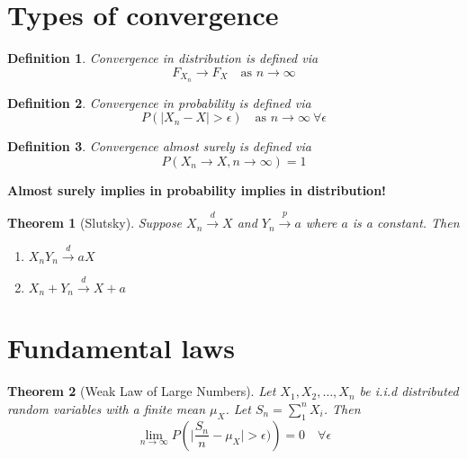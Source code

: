 \documentclass[10pt,a4paper]{article}
\newtheorem{definition}{Definition}
\newtheorem{theorem}{Theorem}
\begin{document}
\section{Types of convergence}

\begin{definition}
Convergence in distribution is defined via
\begin{equation}
F_{X_n} \rightarrow F_X \quad \text{as } n \rightarrow \infty
\end{equation}
\end{definition}

\begin{definition}
	Convergence in probability is defined via
	\begin{equation}
	P(|X_n - X| > \epsilon) \quad \text{as } n \rightarrow \infty \  \forall \epsilon
	\end{equation}
\end{definition}

\begin{definition}
	Convergence almost surely is defined via
	\begin{equation}
	P(X_n \rightarrow X,  n \rightarrow \infty) = 1 
	\end{equation}
\end{definition}


\textbf{Almost surely implies in probability implies in distribution!}

\begin{theorem}[Slutsky]
	
	Suppose $X_n \xrightarrow{d} X$ and $Y_n \xrightarrow{p} a$ where $a$ is a constant. Then
	\begin{enumerate}
		\item $X_n Y_n \xrightarrow{d} aX$
		\item $X_n + Y_n \xrightarrow{d} X+ a$
	\end{enumerate}
\end{theorem}

\section{Fundamental laws}
\begin{theorem}[Weak Law of Large Numbers]
	Let $X_1, X_2, \dots , X_n$ be i.i.d distributed random variables with a finite mean $\mu_X$.  Let $S_n = \sum_1^n X_i$.
	Then
	\begin{equation}
	\lim_{n \to \infty} P\left( \lvert \frac{S_n}{n} - \mu_X \rvert > \epsilon) \right)  = 0 \quad \forall \epsilon
	\end{equation}
	
\end{theorem}
\end{document}
